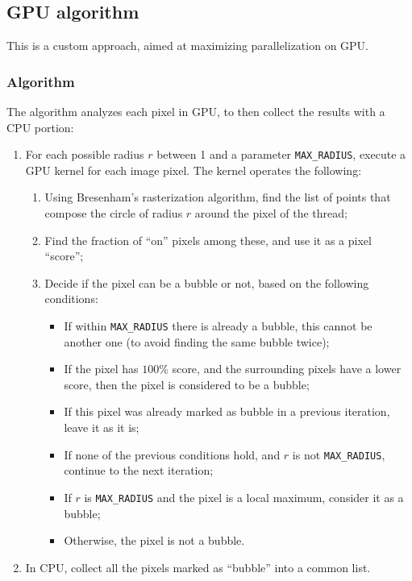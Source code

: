 \subsection{GPU algorithm}

This is a custom approach, aimed at maximizing parallelization on GPU.

\subsubsection{Algorithm}

The algorithm analyzes each pixel in GPU, to then collect the results with a CPU portion:
\begin{enumerate}
	\itemsep 0em
	\item For each possible radius $r$ between 1 and a parameter \texttt{MAX\_RADIUS}, execute a GPU kernel for each image pixel. The kernel operates the following:
	      \begin{enumerate}
		      \item Using Bresenham's rasterization algorithm, find the list of points that compose the circle of radius $r$ around the pixel of the thread;
		      \item Find the fraction of ``on'' pixels among these, and use it as a pixel ``score'';
		      \item Decide if the pixel can be a bubble or not, based on the following conditions:
		            \begin{itemize}
			            \item If within \texttt{MAX\_RADIUS} there is already a bubble, this cannot be another one (to avoid finding the same bubble twice);
			            \item If the pixel has $100\%$ score, and the surrounding pixels have a lower score, then the pixel is considered to be a bubble;
			            \item If this pixel was already marked as bubble in a previous iteration, leave it as it is;
			            \item If none of the previous conditions hold, and $r$ is not \texttt{MAX\_RADIUS}, continue to the next iteration;
			            \item If $r$ is \texttt{MAX\_RADIUS} and the pixel is a local maximum, consider it as a bubble;
			            \item Otherwise, the pixel is not a bubble.
		            \end{itemize}
	      \end{enumerate}
	\item In CPU, collect all the pixels marked as ``bubble'' into a common list.
\end{enumerate}

